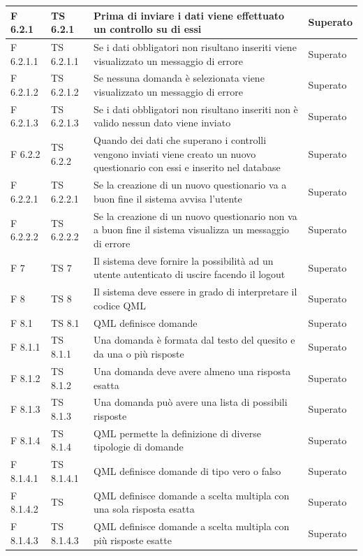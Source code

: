 \documentclass[a4paper,11pt]{article}
\begin{document}
\begin{longtable}{p{}p{}p{}p{}}
\midrule
F 6.2.1 & TS 6.2.1 &Prima di inviare i dati viene effettuato un controllo su di essi & Superato\\
\midrule
F 6.2.1.1 & TS 6.2.1.1 &Se i dati obbligatori non risultano inseriti viene visualizzato un messaggio di errore & Superato\\
\midrule
F 6.2.1.2 &TS 6.2.1.2 &Se nessuna domanda è selezionata viene visualizzato un messaggio di errore & Superato\\
\midrule
F 6.2.1.3 & TS 6.2.1.3 &Se i dati obbligatori non risultano inseriti non è valido nessun dato viene inviato & Superato\\
\midrule
F 6.2.2 &TS 6.2.2 &Quando dei dati che superano i controlli vengono inviati viene creato un nuovo questionario con essi e inserito nel database & Superato\\
\midrule
F 6.2.2.1 &TS 6.2.2.1 &Se la creazione di un nuovo questionario va a buon fine il sistema avvisa l'utente & Superato\\
\midrule
F 6.2.2.2 & TS 6.2.2.2 &Se la creazione di un nuovo questionario non va a buon fine il sistema visualizza un messaggio di errore & Superato\\
\midrule
F 7 & TS 7&Il sistema deve fornire la possibilità ad un utente autenticato di uscire facendo il logout & Superato\\
\midrule
F 8 & TS 8&Il sistema deve essere in grado di interpretare il codice QML & Superato\\
\midrule
F 8.1 & TS 8.1&QML definisce domande & Superato\\
\midrule
F 8.1.1 &TS 8.1.1&Una domanda è formata dal testo del quesito e da una o più risposte & Superato\\
\midrule
F 8.1.2 &TS 8.1.2&Una domanda deve avere almeno una risposta esatta & Superato\\
\midrule
F 8.1.3 & TS 8.1.3&Una domanda può avere una lista di possibili risposte & Superato\\
\midrule
F 8.1.4 & TS 8.1.4 &QML permette la definizione di diverse tipologie di domande & Superato\\
\midrule
F 8.1.4.1 &TS 8.1.4.1 &QML definisce domande di tipo vero o falso & Superato\\
\midrule
F 8.1.4.2 & TS&QML definisce domande a scelta multipla con una sola risposta esatta & Superato\\
\midrule
F 8.1.4.3 & TS 8.1.4.3 &QML definisce domande a scelta multipla con più risposte esatte & Superato\\
\midrule

\end{longtable}
\end{document}
